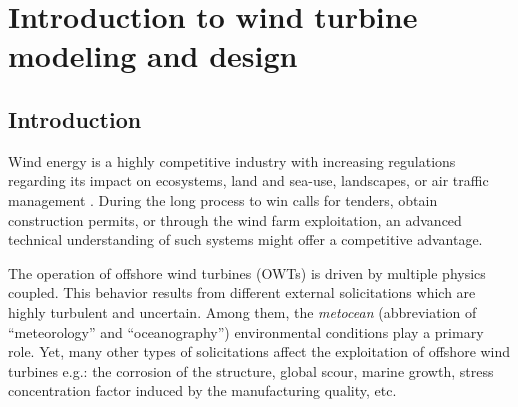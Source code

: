 \cleardoublepage
\chapter{Introduction to wind turbine modeling and design}
\label{chpt:2}
\hfill
\localtableofcontents
\newpage







\section{Introduction}

Wind energy is a highly competitive industry with increasing regulations regarding its impact on ecosystems, land and sea-use, landscapes, or air traffic management \citep{eolien_en_mer_2022}. 
During the long process to win calls for tenders, obtain construction permits, or through the wind farm exploitation, an advanced technical understanding of such systems might offer a competitive advantage. 

The operation of offshore wind turbines (OWTs) is driven by multiple physics coupled. 
This behavior results from different external solicitations which are highly turbulent and uncertain. 
Among them, the \textit{metocean} (abbreviation of ``meteorology'' and ``oceanography'') environmental conditions play a primary role. 
Yet, many other types of solicitations affect the exploitation of offshore wind turbines e.g.: the corrosion of the structure, global scour, marine growth, stress concentration factor induced by the manufacturing quality, etc. 


